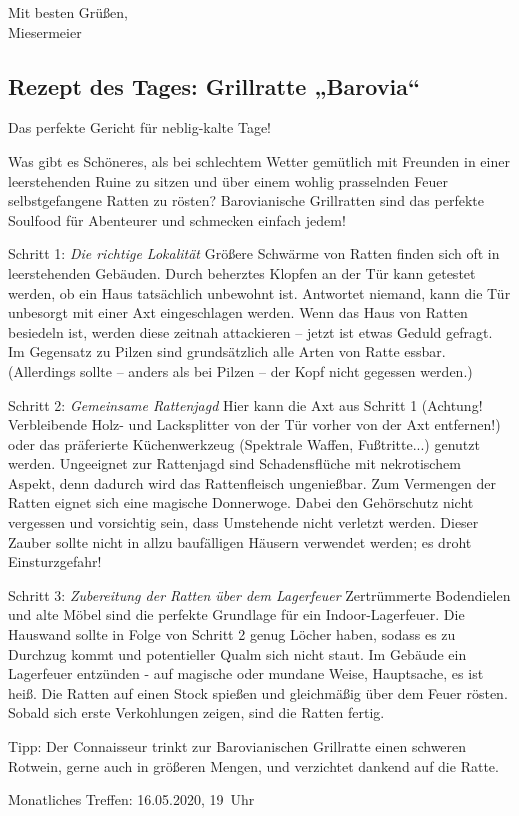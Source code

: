\documentclass[final]{multiversum}
\begin{document}
\noindent
Mit besten Grüßen, \\
Miesermeier


\subsection{Rezept des Tages: Grillratte „Barovia“}

Das perfekte Gericht für neblig-kalte Tage!

Was gibt es Schöneres, als bei schlechtem Wetter gemütlich mit Freunden in einer leerstehenden Ruine zu sitzen und über einem wohlig prasselnden Feuer selbstgefangene Ratten zu rösten? Barovianische Grillratten sind das perfekte Soulfood für Abenteurer und schmecken einfach jedem!

Schritt 1: \textit{Die richtige Lokalität}
Größere Schwärme von Ratten finden sich oft in leerstehenden Gebäuden. Durch beherztes Klopfen an der Tür kann getestet werden, ob ein Haus tatsächlich unbewohnt ist. Antwortet niemand, kann die Tür unbesorgt mit einer Axt eingeschlagen werden. Wenn das Haus von Ratten besiedeln ist, werden diese zeitnah attackieren – jetzt ist etwas Geduld gefragt.
Im Gegensatz zu Pilzen sind grundsätzlich alle Arten von Ratte essbar. (Allerdings sollte – anders als bei Pilzen – der Kopf nicht gegessen werden.)

Schritt 2: \textit{Gemeinsame Rattenjagd}
Hier kann die Axt aus Schritt 1 (Achtung! Verbleibende Holz- und Lacksplitter von der Tür vorher von der Axt entfernen!) oder das präferierte Küchenwerkzeug (Spektrale Waffen, Fußtritte...) genutzt werden. Ungeeignet zur Rattenjagd sind Schadensflüche mit nekrotischem Aspekt, denn dadurch wird das Rattenfleisch ungenießbar.
Zum Vermengen der Ratten eignet sich eine magische Donnerwoge. Dabei den Gehörschutz nicht vergessen und vorsichtig sein, dass Umstehende nicht verletzt werden. Dieser Zauber sollte nicht in allzu baufälligen Häusern verwendet werden; es droht Einsturzgefahr!

Schritt 3: \textit{Zubereitung der Ratten über dem Lagerfeuer}
Zertrümmerte Bodendielen und alte Möbel sind die perfekte Grundlage für ein Indoor-Lagerfeuer. Die Hauswand sollte in Folge von Schritt 2 genug Löcher haben, sodass es zu Durchzug kommt und potentieller Qualm sich nicht staut. Im Gebäude ein Lagerfeuer entzünden - auf magische oder mundane Weise, Hauptsache, es ist heiß. Die Ratten auf einen Stock spießen und gleichmäßig über dem Feuer rösten. Sobald sich erste Verkohlungen zeigen, sind die Ratten fertig.

Tipp: Der Connaisseur trinkt zur Barovianischen Grillratte einen schweren Rotwein, gerne auch in größeren Mengen, und verzichtet dankend auf die Ratte.



\begin{termine}
  \item Monatliches Treffen: 16.05.2020, 19~Uhr
\end{termine}
\impressum
\end{document}
